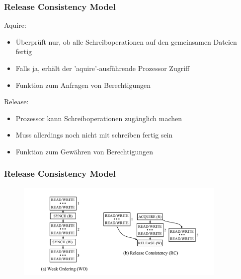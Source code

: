 \documentclass{sikslides}
\begin{document}
\begin{frame}
	\frametitle{Release Consistency Model}
Aquire:
	\begin{itemize}

		\item Überprüft nur, ob alle Schreiboperationen auf den gemeinsamen Dateien fertig
		\item Falls ja, erhält der 'aquire'-ausführende Prozessor Zugriff
		\item Funktion zum Anfragen von Berechtigungen
\bigskip
	\end{itemize}
Release:
\begin{itemize}

		\item Prozessor kann Schreiboperationen zugänglich machen
		\item Muss allerdings noch nicht mit schreiben fertig sein
		\item Funktion zum Gewähren von Berechtigungen

	\end{itemize}
\end{frame}

\begin{frame}
	\frametitle{Release Consistency Model}
\begin{figure}[htbp] 
  \centering
  \includegraphics[width=0.9\textwidth]{figures/compare.png}
  \label{Fig:weak}
\end{figure}

\end{frame}
\end{document}
